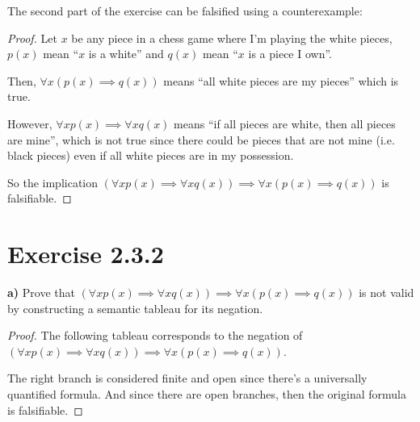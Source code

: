 \documentclass[titlepage, letterpaper, fleqn]{article}
\newcommand{\spacepls}{\vspace{5mm}}
\begin{document}
The second part of the exercise can be falsified using a counterexample:

\begin{proof}
Let \(x\) be any piece in a chess game where I'm playing the white pieces, \(p(x)\) mean ``\(x\) is a white'' and \(q(x)\) mean ``\(x\) is a piece I own''.

Then, \(\forall x(p(x) \implies q(x))\) means ``all white pieces are my pieces'' which is true.

However, \(\forall x p(x) \implies \forall x q(x)\) means ``if all pieces are white, then all pieces are mine'', which is not true since there could be pieces that are not mine (i.e. black pieces) even if all white pieces are in my possession.

So the implication \((\forall x p(x) \implies \forall x q(x)) \implies \forall x (p(x) \implies q(x))\) is falsifiable.
\end{proof}

\section{Exercise 2.3.2}

{\large \textbf{a)} Prove that \((\forall x p(x) \implies \forall x q(x)) \implies \forall x (p(x) \implies q(x))\) is not valid by constructing a semantic tableau for its negation.}

\spacepls
\begin{proof}
The following tableau corresponds to the negation of \((\forall x p(x) \implies \forall x q(x)) \implies \forall x (p(x) \implies q(x))\).
\spacepls


\spacepls

The right branch is considered finite and open since there's a universally quantified formula. And since there are open branches, then the original formula is falsifiable.
\end{proof}
\end{document}
